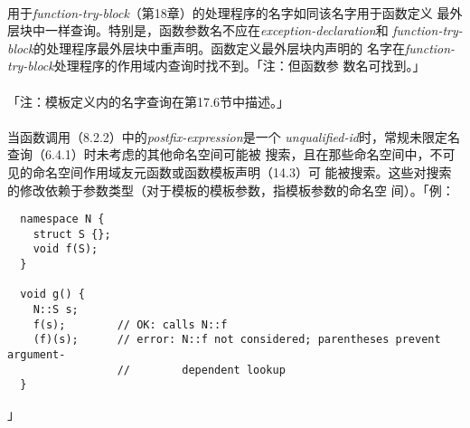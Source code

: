 \paragraph{}
用于\textit{function-try-block}（第18章）的处理程序的名字如同该名字用于函数定义
最外层块中一样查询。特别是，函数参数名不应在\textit{exception-declaration}和
\textit{function-try-block}的处理程序最外层块中重声明。函数定义最外层块内声明的
名字在\textit{function-try-block}处理程序的作用域内查询时找不到。「注：但函数参
数名可找到。」

\paragraph{}
「注：模板定义内的名字查询在第17.6节中描述。」

\paragraph{}
当函数调用（8.2.2）中的\textit{postfix-expression}是一个
\textit{unqualified-id}时，常规未限定名查询（6.4.1）时未考虑的其他命名空间可能被
搜索，且在那些命名空间中，不可见的命名空间作用域友元函数或函数模板声明（14.3）可
能被搜索。这些对搜索的修改依赖于参数类型（对于模板的模板参数，指模板参数的命名空
间）。「例：
\begin{lstlisting}
  namespace N {
    struct S {};
    void f(S);
  }

  void g() {
    N::S s;
    f(s);        // OK: calls N::f
    (f)(s);      // error: N::f not considered; parentheses prevent argument-
                 //        dependent lookup
  }
\end{lstlisting}」

